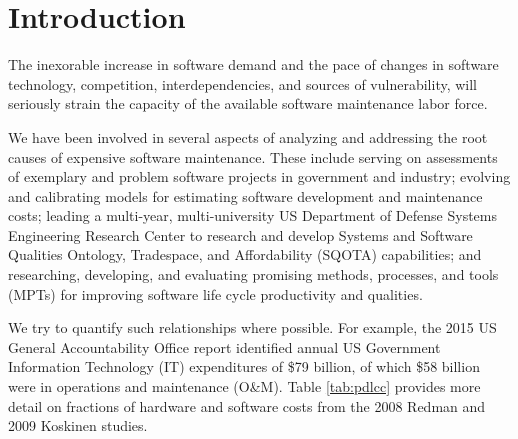 \section{Introduction}
\label{sec:introudction}

The inexorable increase in software demand and the pace of changes in software technology, competition, interdependencies, and sources of vulnerability, will seriously strain the capacity of the available software maintenance labor force.

We have been involved in several aspects of analyzing and addressing the root causes of expensive software maintenance.
These include serving on assessments of
exemplary and
problem software projects in government and industry;
evolving and calibrating models for estimating software development and maintenance costs;
leading a multi-year, multi-university US Department of Defense Systems Engineering Research Center to research and develop Systems and Software Qualities Ontology, Tradespace, and Affordability (SQOTA) capabilities;
and researching, developing, and evaluating promising methods, processes, and tools (MPTs) for improving software life cycle productivity and qualities.

We try to quantify such relationships where possible.
For example, the 2015 US General Accountability Office report \citep{dodaro2015government} identified annual US Government Information Technology (IT) expenditures of \$79 billion, of which \$58 billion were in operations and maintenance (O\&M).
Table \ref{tab:pdlcc} provides more detail on fractions of hardware and software costs from the 2008 Redman \citep{redman2008weapon} and  2009 Koskinen \citep{koskinen2009software} studies.


\begin{table}[htbp]
	\centering
	\caption{Percentage of Post-Deployment Life Cycle Cost}
	\label{tab:pdlcc}
	\vspace{-0.3cm}
\end{table}%

